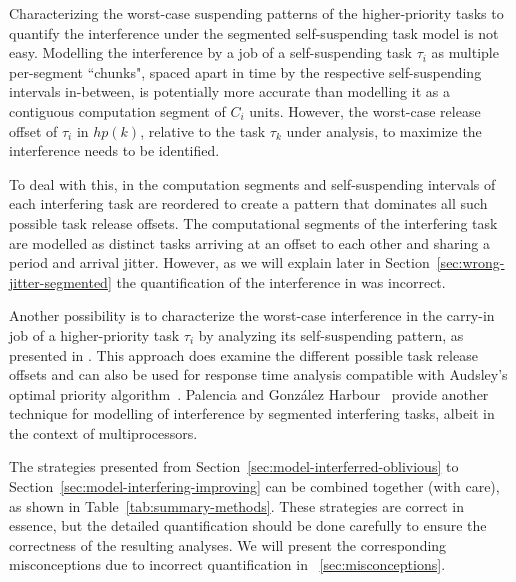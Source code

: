 Characterizing the worst-case 
suspending patterns of the higher-priority tasks to quantify the interference under the segmented self-suspending task model is not easy. 
Modelling the interference by a job of a self-suspending task $\tau_i$ as multiple per-segment ``chunks", spaced apart in time by 
the respective self-suspending intervals in-between, is potentially more accurate than modelling it as a contiguous computation segment of $C_i$ units.
However, the worst-case release offset of $\tau_i$ in $hp(k)$, relative to the task $\tau_k$ under analysis, to maximize the interference needs to be identified.

To deal with this, in \cite{RTCSA-BletsasA05} the computation segments and self-suspending intervals of each interfering task are reordered 
to create a pattern that dominates all such possible task release offsets. The computational segments of the interfering task are modelled 
as distinct tasks arriving at an offset to each other and sharing a period and arrival jitter. However, as we will explain later in 
Section~\ref{sec:wrong-jitter-segmented} the quantification of the interference in \cite{RTCSA-BletsasA05} was incorrect. 

Another possibility is to characterize the worst-case interference in the carry-in job of a higher-priority task $\tau_i$ by analyzing 
its self-suspending pattern, as presented in \cite{Huang:multiseg}. This approach does examine the different possible task release offsets
and can also be used for response time analysis compatible with Audsley's optimal priority algorithm~\cite{Audsley1991aOPA}.
Palencia and Gonz\'alez Harbour~\cite{PH:rtss98} provide another technique for modelling of interference by segmented interfering tasks, 
albeit in the context of multiprocessors. %



The strategies presented from Section~\ref{sec:model-interferred-oblivious} to Section~\ref{sec:model-interfering-improving} can be combined together (with care), as shown in Table~\ref{tab:summary-methods}.  These strategies are correct in essence, but the detailed quantification should be done carefully to ensure the correctness of the resulting analyses. We will present the corresponding misconceptions due to incorrect quantification in \mysectionref{}~\ref{sec:misconceptions}.

